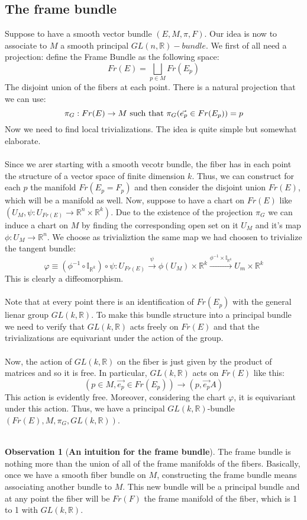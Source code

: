 \documentclass[12pt,a4paper]{report}
\theoremstyle{definition}
\theoremstyle{Theorem}
\theoremstyle{definition}
\theoremstyle{definition}
\newtheorem{Obs}[Def]{Observation}
\begin{document}
		\subsection{The frame bundle}
		Suppose to have a smooth vector bundle $(E,M,\pi,F)$. Our idea is now to associate to $M$ a smooth principal $GL(n,\mathbb{R})-bundle$. We first of all need a projection: define the Frame Bundle as the following space:
		$$Fr(E)=\bigsqcup_{p\in M}Fr(E_p)$$
		The disjoint union of the fibers at each point. There is a natural projection that we can use:
		$$\pi_G:Fr(E)\rightarrow M\hbox{ such that } \pi_G(\vec{e_p}\in Fr(E_p))=p$$
		Now we need to find local trivializations. The idea is quite simple but somewhat elaborate.\\
		\\
		Since we arer starting with a smooth vecotr bundle, the fiber has in each point the structure of a vector space of finite dimension $k$. Thus, we can construct for each $p$ the manifold $Fr(E_p=F_p)$ and then consider the disjoint union $Fr(E)$, which will be a manifold as well. Now, suppose to have a chart on $Fr(E)$ like $(U_{M},\psi:U_{Fr(E)}\rightarrow \mathbb{R}^n\times\mathbb{R}^k)$. Due to the existence of the projection $\pi_G$ we can induce a chart on $M$ by finding the corresponding open set on it $U_M$ and it's map $\phi:U_M\rightarrow \mathbb{R}^n$. We choose as trivializtion the same map we had choosen to trivialize the tangent bundle:
		$$\varphi\equiv(\phi^{-1}\circ \mathbb{I}_{\mathbb{R}^k})\circ \psi: U_{Fr(E)}\xrightarrow{\psi}\phi(U_M)\times\mathbb{R}^k\xrightarrow{\phi^{-1}\times\mathbb{I}_{\mathbb{R}^k}}U_m\times\mathbb{R}^k$$
		This is clearly a diffeomorphism.\\
		\\
		Note that at every point there is an identification of $Fr(E_p)$ with the general lienar group $GL(k,\mathbb{R})$. To make this bundle structure into a principal bundle we need to verify that $GL(k,\mathbb{R})$ acts freely on $Fr(E)$ and that the trivializations are equivariant under the action of the group.\\
		\\
		Now, the action of $GL(k,\mathbb{R})$ on the fiber is just given by the product of matrices and so it is free. In particular, $GL(k,\mathbb{R})$ acts on $Fr(E)$ like this:
		$$(p\in M,\vec{e_p}\in Fr(E_p))\longrightarrow(p,\vec{e_p}A)$$
		This action is evidently free. Moreover, considering the chart $\varphi$, it is equivariant under this action. Thus, we have a principal $GL(k,\mathbb{R})$-bundle $(Fr(E),M,\pi_G,GL(k,\mathbb{R}))$.\\
		\\
		\begin{Obs} [\textbf{An intuition for the frame bundle}]
			The frame bundle is nothing more than the union of all of the frame manifolds of the fibers. Basically, once we have a smooth fiber bundle on $M$, constructing the frame bundle means associating another bundle to $M$. This new bundle will be a principal bundle and at any point the fiber will be $Fr(F)$ the frame manifold of the fiber, which is 1 to 1 with $GL(k,\mathbb{R})$.
		\end{Obs}
\end{document}
